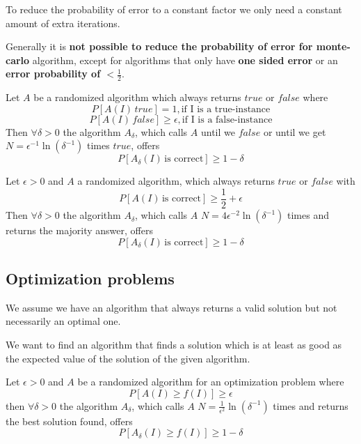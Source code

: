 \begin{remark}
	To reduce the probability of error to a constant factor we only need a constant amount of extra iterations.
\end{remark}

\begin{important}
	Generally it is \textbf{not possible to reduce the probability of error for monte-carlo} algorithm, except for algorithms that only have \textbf{one sided error} or an \textbf{error probability of $\lt \frac{1}{2}$}.
\end{important}

\begin{theorem}
	Let $A$ be a randomized algorithm which always returns $true$ or $false$ where
	$$P[A(I) \, true] = 1, \text{if I is a true-instance}$$
	$$P[A(I) \, false] \geq \epsilon, \text{if I is a false-instance}$$
	Then $\forall \delta \gt 0$ the algorithm $A_\delta$, which calls $A$ until we $false$ or until we get $N = {\epsilon}^{-1} \ln(\delta^{-1})$ times $true$, offers
	$$P[A_\delta(I) \, \text{is correct}] \geq 1 - \delta$$
\end{theorem}

\begin{theorem}
	Let $\epsilon \gt 0$ and $A$ a randomized algorithm, which always returns $true$ or $false$ with
	$$P[A(I) \, \text{is correct}] \geq \frac{1}{2} + \epsilon$$
	Then $\forall \delta \gt 0$ the algorithm $A_\delta$, which calls $A$ $N = 4{\epsilon}^{-2} \ln(\delta^{-1})$ times and returns the majority answer, offers
	$$P[A_\delta(I) \, \text{is correct}] \geq 1 - \delta$$
\end{theorem}

\subsection{Optimization problems}

\begin{remark}
	We assume we have an algorithm that always returns a valid solution but not necessarily an optimal one.
\end{remark}

\begin{example}
	We want to find an algorithm that finds a solution which is at least as good as the expected value of the solution of the given algorithm.
\end{example}

\begin{theorem}
	Let $\epsilon \gt 0$ and $A$ be a randomized algorithm for an optimization problem where
	$$P[A(I) \geq f(I)] \geq  \epsilon$$
	then $\forall \delta \gt 0$ the algorithm $A_\delta$, which calls $A$ $N = \frac{1}{\epsilon^2} \ln(\delta^{-1})$ times and returns the best solution found, offers
	$$P[A_\delta(I) \geq f(I)] \geq 1 - \delta$$
\end{theorem}

